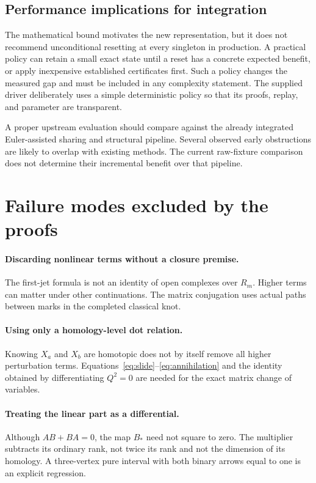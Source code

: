 \documentclass[11pt]{article}
\theoremstyle{definition}\newtheorem{definition}[theorem]{Definition}\newtheorem{example}[theorem]{Example}
\theoremstyle{remark}\newtheorem{remark}[theorem]{Remark}
\begin{document}
\subsection{Performance implications for integration}
The mathematical bound motivates the new representation, but it does not recommend unconditional resetting at every singleton in production. A practical policy can retain a small exact state until a reset has a concrete expected benefit, or apply inexpensive established certificates first. Such a policy changes the measured gap and must be included in any complexity statement. The supplied driver deliberately uses a simple deterministic policy so that its proofs, replay, and parameter are transparent.

A proper upstream evaluation should compare against the already integrated Euler-assisted sharing and structural pipeline. Several observed early obstructions are likely to overlap with existing methods. The current raw-fixture comparison does not determine their incremental benefit over that pipeline.

\section{Failure modes excluded by the proofs}
\paragraph{Discarding nonlinear terms without a closure premise.}
The first-jet formula is not an identity of open complexes over $R_m$. Higher terms can matter under other continuations. The matrix conjugation uses actual paths between marks in the completed classical knot.

\paragraph{Using only a homology-level dot relation.}
Knowing $X_a$ and $X_b$ are homotopic does not by itself remove all higher perturbation terms. Equations~\eqref{eq:slide}--\eqref{eq:annihilation} and the identity obtained by differentiating $Q^2=0$ are needed for the exact matrix change of variables.

\paragraph{Treating the linear part as a differential.}
Although $AB+BA=0$, the map $B_*$ need not square to zero. The multiplier subtracts its ordinary rank, not twice its rank and not the dimension of its homology. A three-vertex pure interval with both binary arrows equal to one is an explicit regression.
\end{document}
